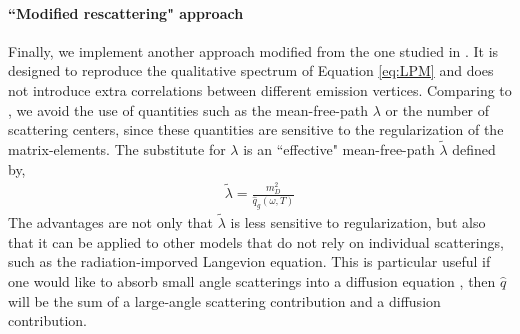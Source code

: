 \documentclass[aps, prc, reprint, amsmath, groupedaddress, nofootinbib]{revtex4-1}
\begin{document}
\paragraph*{``Modified rescattering" approach} Finally, we implement another approach modified from the one studied in \cite{Zapp:2011ya,Park:thesis,Park:2016jap}.
It is designed to reproduce the qualitative spectrum of Equation \ref{eq:LPM} and does not introduce extra correlations between different emission vertices. 
Comparing to \cite{Zapp:2011ya}, we avoid the use of quantities such as the mean-free-path $\lambda$ or the number of scattering centers, since these quantities are sensitive to the regularization of the matrix-elements. 
The substitute for $\lambda$ is an ``effective" mean-free-path $\tilde{\lambda}$ defined by,
\begin{eqnarray}\label{eq:effmpf}
\tilde{\lambda} = \frac{m_D^2}{\hat{q}_g(\omega, T)}
\end{eqnarray}
The advantages are not only that $\tilde{\lambda}$ is less sensitive to regularization, but also that it can be applied to other models that do not rely on individual scatterings, such as the radiation-imporved Langevion equation.
This is particular useful if one would like to absorb small angle scatterings into a diffusion equation \cite{Ghiglieri:2015ala}, then $\hat{q}$ will be the sum of a large-angle scattering contribution and a diffusion contribution.
\end{document}
